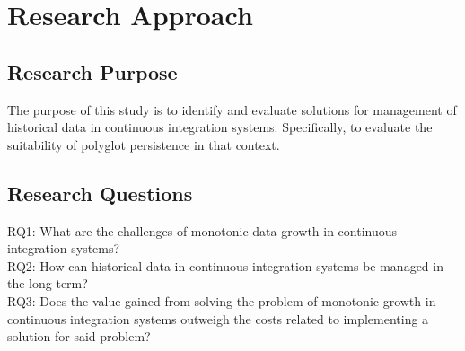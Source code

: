 \chapter{Research Approach}
\label{chap:research}

\section{Research Purpose}

The purpose of this study is to identify and evaluate solutions for management of historical data in continuous integration systems. Specifically, to evaluate the suitability of polyglot persistence in that context.

\section{Research Questions}
RQ1: What are the challenges of monotonic data growth in continuous integration systems? \\
RQ2: How can historical data in continuous integration systems be managed in the long term? \\
RQ3: Does the value gained from solving the problem of monotonic growth in continuous integration systems outweigh the costs related to implementing a solution for said problem? \\


%

